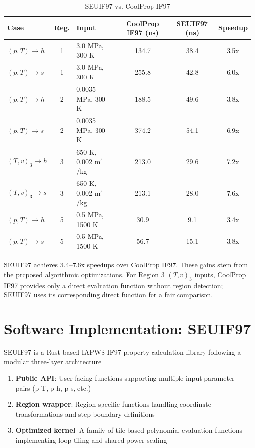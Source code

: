 \documentclass{article}
\begin{document}
\begin{table}[H]
\centering
\small
\caption{SEUIF97 vs. CoolProp IF97}
\label{tab:benchmarks_seuif97_coolprop_if97}
\begin{tabular}{@{}lclccc@{}}
\toprule
\textbf{Case} & \textbf{Reg.} & \textbf{Input} & \textbf{CoolProp IF97 (ns)} & \textbf{SEUIF97 (ns)} & \textbf{Speedup} \\
\midrule
$(p,T)\!\rightarrow\!h$ & 1 & 3.0 MPa, 300 K & 134.7 & 38.4 & 3.5x \\
$(p,T)\!\rightarrow\!s$ & 1 & 3.0 MPa, 300 K & 255.8 & 42.8 & 6.0x \\
$(p,T)\!\rightarrow\!h$ & 2 & 0.0035 MPa, 300 K & 188.5 & 49.6 & 3.8x \\
$(p,T)\!\rightarrow\!s$ & 2 & 0.0035 MPa, 300 K & 374.2 & 54.1 & 6.9x \\
$(T,v)_3\!\rightarrow\!h$ & 3 & 650 K, 0.002 m$^3$/kg & 213.0 & 29.6 & 7.2x \\
$(T,v)_3\!\rightarrow\!s$ & 3 & 650 K, 0.002 m$^3$/kg & 213.1 & 28.0 & 7.6x \\
$(p,T)\!\rightarrow\!h$ & 5 & 0.5 MPa, 1500 K & 30.9 & 9.1 & 3.4x \\
$(p,T)\!\rightarrow\!s$ & 5 & 0.5 MPa, 1500 K & 56.7 & 15.1 & 3.8x \\
\bottomrule
\end{tabular}
\end{table}

SEUIF97 achieves 3.4--7.6x speedups over CoolProp IF97. These gains stem from the proposed algorithmic optimizations. For Region 3 $(T,v)_3$ inputs, CoolProp IF97 provides only a direct evaluation function without region detection; SEUIF97 uses its corresponding direct function for a fair comparison.

\section{Software Implementation: SEUIF97}
\label{sec:software-implementation-seuif97}  
SEUIF97 is a Rust-based IAPWS-IF97 property calculation library following a modular three-layer architecture:

\begin{enumerate}
    \item \textbf{Public API}: User-facing functions supporting multiple input parameter pairs (p-T, p-h, p-s, etc.)
    \item \textbf{Region wrapper}: Region-specific functions handling coordinate transformations and step boundary definitions
    \item \textbf{Optimized kernel}: A family of tile-based polynomial evaluation functions implementing loop tiling and shared-power scaling
\end{enumerate}
\end{document}
